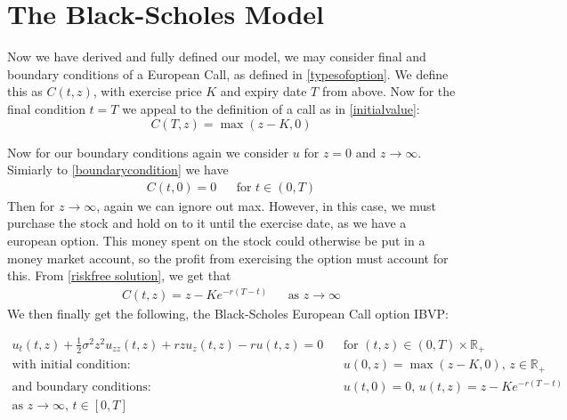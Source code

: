 \documentclass[11pt]{article} %
\begin{document}
\section{The Black-Scholes Model}
Now we have derived and fully defined our model, we may consider final and boundary 
conditions of a European Call, as defined in \ref{typesofoption}. We define this as 
$C(t,z)$, with exercise price $K$ and expiry date $T$ from above. Now for the final 
condition $t=T$ we appeal to the definition of a call as in \ref{initialvalue}:
\begin{equation}
    C(T, z) = \max{(z-K, 0)}
\end{equation}

Now for our boundary conditions again we consider $u$ for $z=0$ and $z \to \infty$. Simiarly 
to \ref{boundarycondition} we have 
\begin{align}
    C(t, 0) = 0 &&\text{for } t \in (0,T)
\end{align}
Then for $z \to \infty$, again we can ignore out max. However, in this case, we must 
purchase the stock and hold on to it until the exercise date, as we have a 
european option. This money spent on the stock could otherwise be put in a 
money market account, so the profit from exercising the option must account for this.
From \ref{riskfree solution}, we get that 
\begin{align}
    C(t,z) = z - Ke^{-r(T-t)} &&\text{as } z \to \infty
\end{align}
We then finally get the following, the Black-Scholes European Call option IBVP:

\begin{align}
    u_t(t,z) +\frac{1}{2}\sigma^2z^2u_{zz}(t,z) + rzu_z(t,z) - ru(t,z) = 0 &&
    \text{for $(t,z) \in (0,T) \times \mathbb{R}_+ $}\\
    \text{with initial condition: } &&
     u(0,z) = \max{(z-K, 0)} \text{, } z \in \mathbb{R}_+ \\
    \text{and boundary conditions: } && 
    u(t, 0) = 0 \text{,  $u(t,z) = z - Ke^{-r(T-t)}$}\\
    \text{as $z \to \infty $,  $t \in [0,T]$}
\end{align}
\end{document}
